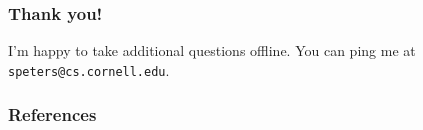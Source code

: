 \documentclass[usenames, dvipsnames, t, table]{beamer}
\newcommand{\eps}{\epsilon}
\begin{document}

  \begin{frame}
    \frametitle{Thank you!}
    I'm happy to take additional questions offline. You can ping me at \texttt{speters@cs.cornell.edu}.
  \end{frame}

  \begin{frame}[allowframebreaks]
    \frametitle{References}
    
    
  \end{frame}

\end{document}
